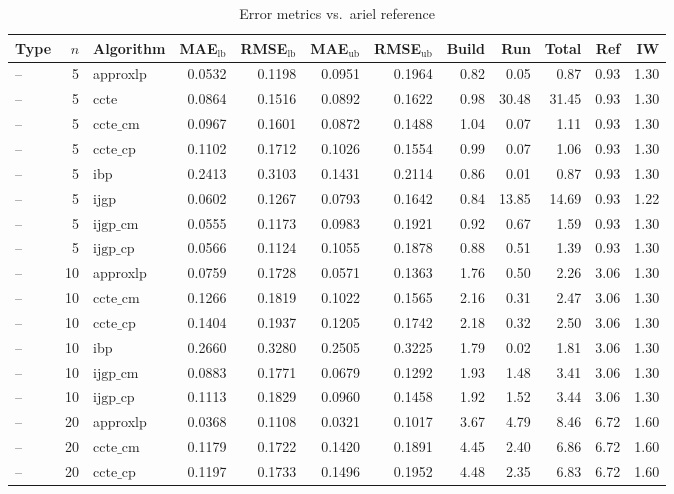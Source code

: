 \begin{table}[ht]
\centering
\scriptsize
\caption{Error metrics vs.\ ariel reference}
\begin{tabular}{lrlrrrrrrrrr}
\toprule
Type & $n$ & Algorithm & MAE$_{\text{lb}}$ & RMSE$_{\text{lb}}$ & MAE$_{\text{ub}}$ & RMSE$_{\text{ub}}$ & Build & Run & Total & Ref & IW \\
\midrule
-- & 5 & approxlp & 0.0532 & 0.1198 & 0.0951 & 0.1964 & 0.82 & 0.05 & 0.87 & 0.93 & 1.30 \\
-- & 5 & ccte & 0.0864 & 0.1516 & 0.0892 & 0.1622 & 0.98 & 30.48 & 31.45 & 0.93 & 1.30 \\
-- & 5 & $\text{ccte\_cm}$ & 0.0967 & 0.1601 & 0.0872 & 0.1488 & 1.04 & 0.07 & 1.11 & 0.93 & 1.30 \\
-- & 5 & $\text{ccte\_cp}$ & 0.1102 & 0.1712 & 0.1026 & 0.1554 & 0.99 & 0.07 & 1.06 & 0.93 & 1.30 \\
-- & 5 & ibp & 0.2413 & 0.3103 & 0.1431 & 0.2114 & 0.86 & 0.01 & 0.87 & 0.93 & 1.30 \\
-- & 5 & ijgp & 0.0602 & 0.1267 & 0.0793 & 0.1642 & 0.84 & 13.85 & 14.69 & 0.93 & 1.22 \\
-- & 5 & $\text{ijgp\_cm}$ & 0.0555 & 0.1173 & 0.0983 & 0.1921 & 0.92 & 0.67 & 1.59 & 0.93 & 1.30 \\
-- & 5 & $\text{ijgp\_cp}$ & 0.0566 & 0.1124 & 0.1055 & 0.1878 & 0.88 & 0.51 & 1.39 & 0.93 & 1.30 \\
-- & 10 & approxlp & 0.0759 & 0.1728 & 0.0571 & 0.1363 & 1.76 & 0.50 & 2.26 & 3.06 & 1.30 \\
-- & 10 & $\text{ccte\_cm}$ & 0.1266 & 0.1819 & 0.1022 & 0.1565 & 2.16 & 0.31 & 2.47 & 3.06 & 1.30 \\
-- & 10 & $\text{ccte\_cp}$ & 0.1404 & 0.1937 & 0.1205 & 0.1742 & 2.18 & 0.32 & 2.50 & 3.06 & 1.30 \\
-- & 10 & ibp & 0.2660 & 0.3280 & 0.2505 & 0.3225 & 1.79 & 0.02 & 1.81 & 3.06 & 1.30 \\
-- & 10 & $\text{ijgp\_cm}$ & 0.0883 & 0.1771 & 0.0679 & 0.1292 & 1.93 & 1.48 & 3.41 & 3.06 & 1.30 \\
-- & 10 & $\text{ijgp\_cp}$ & 0.1113 & 0.1829 & 0.0960 & 0.1458 & 1.92 & 1.52 & 3.44 & 3.06 & 1.30 \\
-- & 20 & approxlp & 0.0368 & 0.1108 & 0.0321 & 0.1017 & 3.67 & 4.79 & 8.46 & 6.72 & 1.60 \\
-- & 20 & $\text{ccte\_cm}$ & 0.1179 & 0.1722 & 0.1420 & 0.1891 & 4.45 & 2.40 & 6.86 & 6.72 & 1.60 \\
-- & 20 & $\text{ccte\_cp}$ & 0.1197 & 0.1733 & 0.1496 & 0.1952 & 4.48 & 2.35 & 6.83 & 6.72 & 1.60 \\

\end{tabular}
\end{table}
